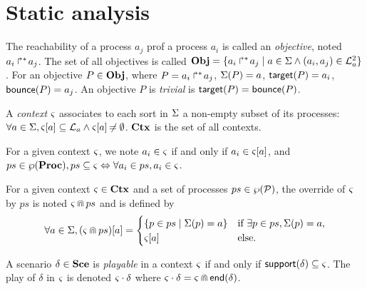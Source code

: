 \section{Static analysis}\label{sec:sa}


\begin{definition}
\label{def:obj}
  The reachability of a process $a_j$ prof a process $a_i$ is called an \emph{objective}, noted $\mbox{$a_i\Rsh^*\!a_j$}$.
  The set of all objectives is called $\mathbf{Obj} = \{ \mbox{$a_i\Rsh^*\!a_j$} \mid a \in \Sigma \wedge (a_i, a_j) \in \mathcal{L}_a^2 \}$.
  For an objective $P \in \mathbf{Obj}$, where $P = \mbox{$a_i\Rsh^*\!a_j$}$, $\Sigma(P) = a$, $\mathsf{target}(P)=a_i$, $\mathsf{bounce}(P)=a_j$.
  An objective $P$ is \emph{trivial} is $\mathsf{target}(P)=\mathsf{bounce}(P)$.
\end{definition}

\begin{definition}
\label{def:context}
  A \emph{context} $\varsigma$ associates to each sort in $\Sigma$ a non-empty subset of its processes:
  $\forall a \in \Sigma, {\varsigma[a]} \subseteq \mathcal{L}_a \wedge {\varsigma[a]} \not\nobreak\mkern -2mu = \emptyset$.
  $\mathbf{Ctx}$ is the set of all contexts.
\end{definition}

For a given context $\varsigma$, we note $a_i \in \varsigma$ if and only if $a_i \in {\varsigma[a]}$, and
$ps \in \wp(\mathbf{Proc}), ps \subseteq \varsigma \Leftrightarrow \forall a_i \in ps, a_i \in \varsigma$.
\begin{definition}[$\Cap: \Ctx \times \powerset(\PHproc) \mapsto \Ctx$]
\label{def:ctxcap}
  For a given context $\varsigma\in\mathbf{Ctx}$ and a set of processes $ps \in \wp(\mathcal{P})$,
  the override of $\varsigma$ by $ps$ is noted $\varsigma \Cap ps$ and is defined by
  \[ \forall a \in \Sigma, {(\varsigma \Cap ps)[a]} =
  \begin{cases}
    \{ p \in ps \mid \Sigma(p)=a \} & \text{if } \exists p \in ps, \Sigma(p)=a,\\
    {\varsigma[a]} & \text{else.}
  \end{cases}
  \]
\end{definition}

A scenario $\delta \in \mathbf{Sce}$ is \emph{playable} in a context $\varsigma$ if and only if $\mathsf{support}(\delta) \subseteq \varsigma$. 
The play of $\delta$ in $\varsigma$ is denoted $\varsigma \cdot \delta$ where $\varsigma \cdot \delta = \varsigma \Cap \mathsf{end}(\delta)$.

